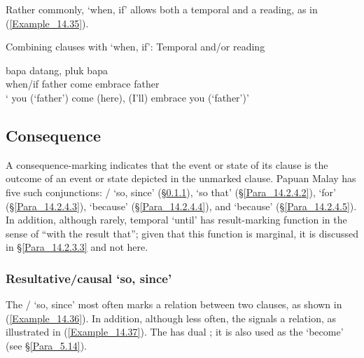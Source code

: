 \noindent Rather commonly,  ‘when, if’ allows both a temporal and a  reading, as in (\ref{Example_14.35}).

\begin{styleExampleTitle}
Combining clauses with  ‘when, if’: Temporal and/or  reading
\end{styleExampleTitle}
\ea\label{Example_14.35}
 {bapa} {datang,} {pluk} {bapa}\\ %
 when/if  father  come  embrace  father\\
\glt ‘ you (‘father’) come (here), (I’ll) embrace you (‘father’)’ \textstyleExampleSource{[080922-001a-CvPh.0360]}
\z

\subsection{Consequence}
\label{Para_14.2.4}
A consequence-marking  indicates that the event or state of its clause is the outcome of an event or state depicted in the unmarked clause. Papuan Malay has five such conjunctions: /  ‘so, since’ (§\ref{Para_14.2.4.1}),   ‘so that’ (§\ref{Para_14.2.4.2}),   ‘for’ (§\ref{Para_14.2.4.3}),   ‘because’ (§\ref{Para_14.2.4.4}), and   ‘because’ (§\ref{Para_14.2.4.5}). In addition, although rarely, temporal  ‘until’ has result-marking function in the sense of ``with the result that''; given that this function is marginal, it is discussed in §\ref{Para_14.2.3.3} and not here.


\subsubsection[Resultative/{causal} jadi ‘so, since’]{Resultative/{causal}  ‘so, since’}
\label{Para_14.2.4.1}
The /   ‘so, since’ most often marks a  relation between two clauses, as shown in (\ref{Example_14.36}). In addition, although less often, the  signals a  relation, as illustrated in (\ref{Example_14.37}). The  has dual ; it is also used as the    ‘become’ (see §\ref{Para_5.14}).



